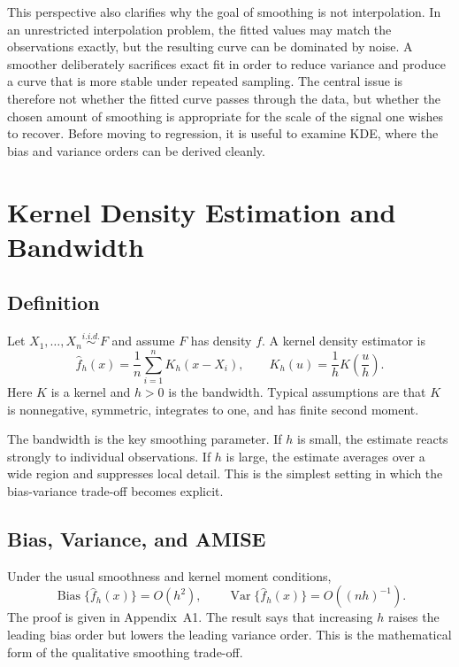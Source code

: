 \documentclass[12pt,a4paper]{article}
\begin{document}
This perspective also clarifies why the goal of smoothing is not interpolation. In an unrestricted interpolation problem, the fitted values may match the observations exactly, but the resulting curve can be dominated by noise. A smoother deliberately sacrifices exact fit in order to reduce variance and produce a curve that is more stable under repeated sampling. The central issue is therefore not whether the fitted curve passes through the data, but whether the chosen amount of smoothing is appropriate for the scale of the signal one wishes to recover. Before moving to regression, it is useful to examine KDE, where the bias and variance orders can be derived cleanly.

\section{Kernel Density Estimation and Bandwidth}
\label{sec:kde}

\subsection{Definition}

Let \(X_1,\ldots,X_n\overset{i.i.d.}{\sim}F\) and assume \(F\) has density \(f\). A kernel density estimator is
\[
\hat f_h(x)=\frac{1}{n}\sum_{i=1}^{n}K_h(x-X_i),
\qquad
K_h(u)=\frac{1}{h}K\left(\frac{u}{h}\right).
\]
Here \(K\) is a kernel and \(h>0\) is the bandwidth. Typical assumptions are that \(K\) is nonnegative, symmetric, integrates to one, and has finite second moment.

The bandwidth is the key smoothing parameter. If \(h\) is small, the estimate reacts strongly to individual observations. If \(h\) is large, the estimate averages over a wide region and suppresses local detail. This is the simplest setting in which the bias-variance trade-off becomes explicit.

\subsection{Bias, Variance, and AMISE}

Under the usual smoothness and kernel moment conditions,
\[
\operatorname{Bias}\{\hat f_h(x)\}=O(h^2),
\qquad
\operatorname{Var}\{\hat f_h(x)\}=O((nh)^{-1}).
\]
The proof is given in Appendix~A1. The result says that increasing \(h\) raises the leading bias order but lowers the leading variance order. This is the mathematical form of the qualitative smoothing trade-off.
\end{document}
